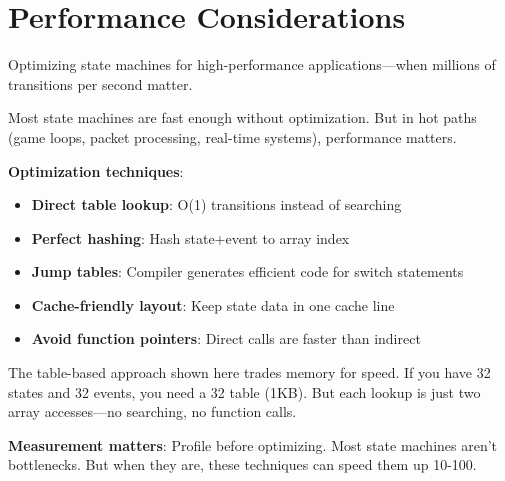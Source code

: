 \section{Performance Considerations}

Optimizing state machines for high-performance applications---when millions of transitions per second matter.

Most state machines are fast enough without optimization. But in hot paths (game loops, packet processing, real-time systems), performance matters.

\textbf{Optimization techniques}:
\begin{itemize}
    \item \textbf{Direct table lookup}: O(1) transitions instead of searching
    \item \textbf{Perfect hashing}: Hash state+event to array index
    \item \textbf{Jump tables}: Compiler generates efficient code for switch statements
    \item \textbf{Cache-friendly layout}: Keep state data in one cache line
    \item \textbf{Avoid function pointers}: Direct calls are faster than indirect
\end{itemize}

The table-based approach shown here trades memory for speed. If you have 32 states and 32 events, you need a 32 table (1KB). But each lookup is just two array accesses---no searching, no function calls.

\textbf{Measurement matters}: Profile before optimizing. Most state machines aren't bottlenecks. But when they are, these techniques can speed them up 10-100\times.

